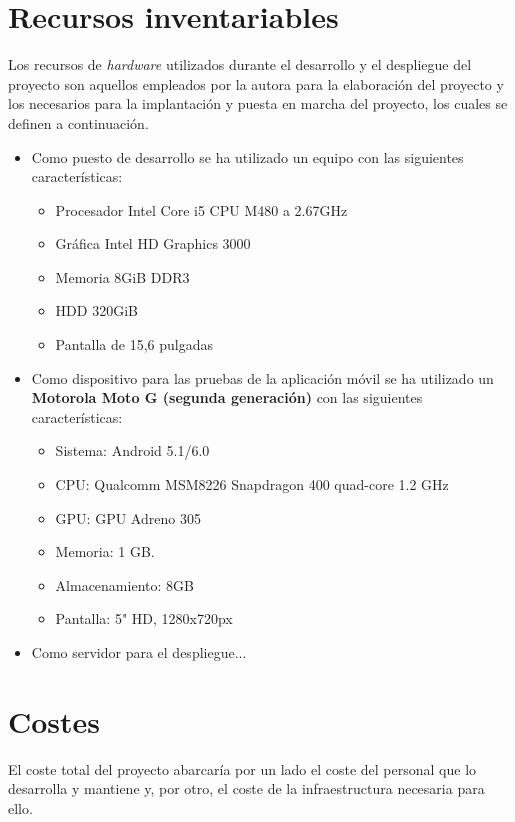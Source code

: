 \section{Recursos inventariables}

Los recursos de \textit{hardware} utilizados durante el desarrollo y el
despliegue del proyecto son aquellos empleados por la autora para la elaboración
del proyecto y los necesarios para la implantación y puesta en marcha del
proyecto, los cuales se definen a continuación.

\begin{itemize}
\item Como puesto de desarrollo se ha utilizado un equipo con las siguientes
  características:
  \begin{itemize}
  \item Procesador Intel Core i5 CPU M480 a 2.67GHz
  \item Gráfica Intel HD Graphics 3000
  \item Memoria 8GiB DDR3
  \item HDD 320GiB
  \item Pantalla de 15,6 pulgadas
  \end{itemize}

\item Como dispositivo para las pruebas de la aplicación móvil se ha utilizado
  un \textbf{Motorola Moto G (segunda generación)} con las siguientes
  características:

  \begin{itemize}
  \item Sistema: Android 5.1/6.0
  \item CPU: Qualcomm MSM8226 Snapdragon 400 quad-core 1.2 GHz
  \item GPU: GPU Adreno 305
  \item Memoria: 1 GB.
  \item Almacenamiento: 8GB
  \item Pantalla: 5" HD, 1280x720px
  \end{itemize}

\item Como servidor para el despliegue...
  
\end{itemize}


\section{Costes}

El coste total del proyecto abarcaría por un lado el coste del personal que
lo desarrolla y mantiene y, por otro, el coste de la infraestructura necesaria
para ello.


